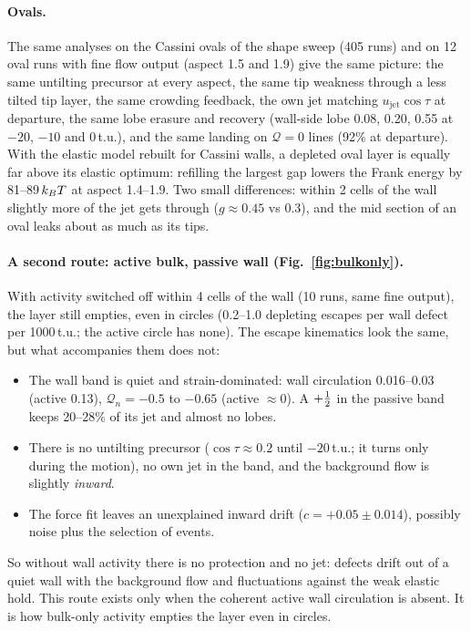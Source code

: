 \paragraph{Ovals.} The same analyses on the Cassini ovals of the shape sweep (405 runs) and on 12 oval runs with fine flow output (aspect 1.5 and 1.9) give the same
picture: the same untilting precursor at every aspect, the same tip weakness through a less tilted tip layer, the same crowding feedback, the own jet matching $u_\mathrm{jet}\cos\tau$ at
departure, the same lobe erasure and recovery (wall-side lobe 0.08, 0.20, 0.55 at $-20$, $-10$ and 0\,t.u.), and the same landing on $\mathcal Q=0$ lines (92\% at departure). With the elastic model rebuilt for Cassini walls, a depleted oval layer is equally far above its elastic optimum: refilling the largest gap lowers the Frank energy by 81--89\,$k_BT$ at aspect 1.4--1.9. Two small
differences: within 2 cells of the wall slightly more of the jet gets through ($g\approx0.45$ vs 0.3), and the mid section of an oval leaks about as much as its tips.

\paragraph{A second route: active bulk, passive wall (Fig.~\ref{fig:bulkonly}).} With activity switched off within 4 cells of the wall (10 runs, same fine output), the layer still empties,
even in circles (0.2--1.0 depleting escapes per wall defect per 1000\,t.u.; the active circle has none). The escape kinematics look the same, but what accompanies them does not:
\begin{itemize}
  \item The wall band is quiet and strain-dominated: wall circulation 0.016--0.03 (active 0.13), $\mathcal Q_n=-0.5$ to $-0.65$ (active $\approx0$).
        A $+\tfrac12$ in the passive band keeps 20--28\% of its jet and almost no lobes.
  \item There is no untilting precursor ($\cos\tau\approx0.2$ until $-20$\,t.u.; it turns only during the motion), no own jet in the band, and the background flow is slightly \emph{inward}.
  \item The force fit leaves an unexplained inward drift ($c=+0.05\pm0.014$), possibly noise plus the selection of events.
\end{itemize}
So without wall activity there is no protection and no jet: defects drift out of a quiet wall with the background flow and fluctuations against the weak elastic hold. This route
exists only when the coherent active wall circulation is absent. It is how bulk-only activity empties the layer even in circles.

